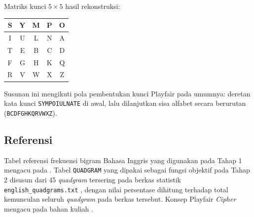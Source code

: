 Matriks kunci $5 \times 5$ hasil rekonstruksi:

\begin{center}
  \begin{tabular}{|c|c|c|c|c|}
    \hline
    S & Y & M & P & O \\
    \hline
    I & U & L & N & A \\
    \hline
    T & E & B & C & D \\
    \hline
    F & G & H & K & Q \\
    \hline
    R & V & W & X & Z \\
    \hline
  \end{tabular}
\end{center}

Susunan ini mengikuti pola pembentukan kunci Playfair pada umumnya: deretan kata kunci
\texttt{SYMPOIULNATE} di awal, lalu dilanjutkan sisa alfabet secara berurutan
(\texttt{BCDFGHKQRVWXZ}).

\subsection*{Referensi}

Tabel referensi frekuensi bigram Bahasa Inggris yang digunakan pada Tahap 1 mengacu pada
\cite{cornell-freq, case-ngram}. Tabel \texttt{QUADGRAM} yang dipakai sebagai fungsi objektif pada
Tahap 2 disusun dari 45 \textit{quadgram} tersering pada berkas statistik \texttt{english\_quadgrams.txt}
\cite{quadgram-data}, dengan nilai persentase dihitung terhadap total kemunculan seluruh
\textit{quadgram} pada berkas tersebut. Konsep Playfair \textit{Cipher} mengacu pada bahan kuliah
\cite{munir-klasik2}.
